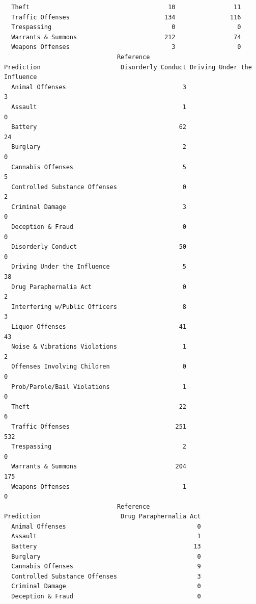 \documentclass[
  article]{jss}
\begin{document}
\begin{verbatim}
  Theft                                      10                11
  Traffic Offenses                          134               116
  Trespassing                                 0                 0
  Warrants & Summons                        212                74
  Weapons Offenses                            3                 0
                               Reference
Prediction                      Disorderly Conduct Driving Under the Influence
  Animal Offenses                                3                           3
  Assault                                        1                           0
  Battery                                       62                          24
  Burglary                                       2                           0
  Cannabis Offenses                              5                           5
  Controlled Substance Offenses                  0                           2
  Criminal Damage                                3                           0
  Deception & Fraud                              0                           0
  Disorderly Conduct                            50                           0
  Driving Under the Influence                    5                          38
  Drug Paraphernalia Act                         0                           2
  Interfering w/Public Officers                  8                           3
  Liquor Offenses                               41                          43
  Noise & Vibrations Violations                  1                           2
  Offenses Involving Children                    0                           0
  Prob/Parole/Bail Violations                    1                           0
  Theft                                         22                           6
  Traffic Offenses                             251                         532
  Trespassing                                    2                           0
  Warrants & Summons                           204                         175
  Weapons Offenses                               1                           0
                               Reference
Prediction                      Drug Paraphernalia Act
  Animal Offenses                                    0
  Assault                                            1
  Battery                                           13
  Burglary                                           0
  Cannabis Offenses                                  9
  Controlled Substance Offenses                      3
  Criminal Damage                                    0
  Deception & Fraud                                  0

\end{verbatim}
\end{document}
